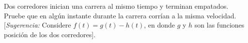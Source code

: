 \item Dos corredores inician una carrera al mismo tiempo y terminan empatados. Pruebe que en algún instante durante la carrera corrían a la misma velocidad. [\textit{Sugerencia:} Considere $f(t) = g(t) - h(t)$, en donde $g$ y $h$ son las funciones posición de los dos corredores].
